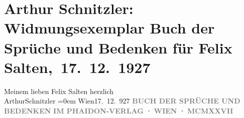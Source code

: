 

         
         \renewcommand{\erwaehntePersonen}{Personen: Felix Salten}
         \renewcommand{\erwaehnteInstitutionen}{Institutionen: Phaidon-Verlag}
         \renewcommand{\erwaehnteOrte}{Orte: Wien}
         \renewcommand{\erwaehnteWerke}{Werke: Buch der Sprüche und Bedenken}
               \section[ Arthur Schnitzler: Widmungsexemplar Buch der Sprüche und Bedenken für Felix Salten, 17. 12. 1927]{ Arthur Schnitzler: Widmungsexemplar Buch der Sprüche und Bedenken für
               Felix Salten, 17. 12. 1927}\nopagebreak{}\rehead{ }\begin{ledgroupsized}[t]{13cm}\normalsize\beginnumbering{} \toendnotes[C]{\smallbreak\pagebreak[2]} 
\pstart
           \noindent{}{\pb}Meinem lieben Felix Salten\pend
           \pstart
           herzlich {\\[\baselineskip]}\spacefill\mbox{ArthurSchnitzler}\pend
           \leftskip=0em{}\pstart
           Wien17. 12. 927\pend
           {\bigskip}\pstart
           \noindent{}\centering{}{\pb}\textcolor{gray}{\textbf{}}\pend
           \pstart
           \noindent{}\centering{}\textcolor{gray}{\textbf{BUCH DER SPRÜCHE UND BEDENKEN}}\pend
           \pstart
           \noindent{}\centering{}\textcolor{gray}{\textbf{}}\pend
           {\bigskip}\pstart
           \noindent{}\centering{}\textcolor{gray}{\textbf{IM PHAIDON-VERLAG ⋅ WIEN ⋅ MCMXXVII}}\pend
           
         
         \endnumbering{}\end{ledgroupsized}  \newcommand{\dateiname}{L03610}\newcommand{\titel}{Arthur Schnitzler: Widmungsexemplar Buch der Sprüche und Bedenken für Felix Salten, 17. 12. 1927}\newcommand{\editorInnen}{Martin Anton Müller und Laura Untner}
      
